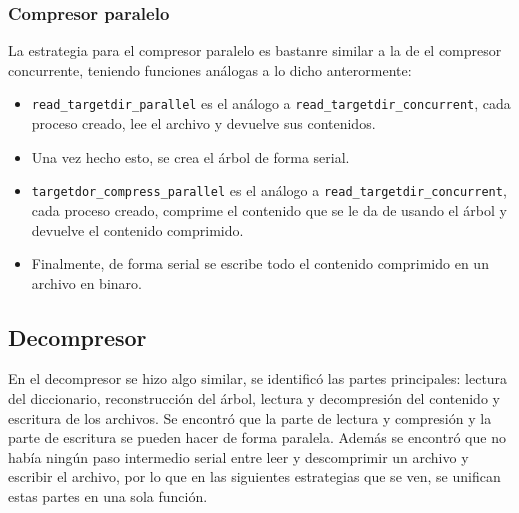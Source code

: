 \documentclass{report}
\begin{document}
\subsubsection {Compresor paralelo}

La estrategia para el compresor paralelo es bastanre similar a la de el compresor concurrente, teniendo funciones análogas a lo dicho anterormente:
\begin{itemize}
    \item \texttt{read\_targetdir\_parallel} es el análogo a \texttt{read\_targetdir\_concurrent}, cada proceso creado, lee el archivo y devuelve sus contenidos.  
    \item Una vez hecho esto, se crea el árbol de forma serial.
    \item \texttt{targetdor\_compress\_parallel} es el análogo a \texttt{read\_targetdir\_concurrent}, cada proceso creado, comprime el contenido que se le da de usando el árbol y devuelve el contenido comprimido. 
    \item Finalmente, de forma serial se escribe todo el contenido comprimido en un archivo en binaro.
\end{itemize}


\subsection {Decompresor}
En el decompresor se hizo algo similar, se identificó las partes principales: lectura del diccionario, reconstrucción del árbol, lectura y decompresión del contenido y escritura de los archivos. 
Se encontró que la parte de lectura y compresión y la parte de escritura se pueden hacer de forma paralela.
Además se encontró que no había ningún paso intermedio serial entre leer y descomprimir un archivo y escribir el archivo, por lo que en las siguientes estrategias que se ven, se unifican estas partes en una sola función.
\end{document}
